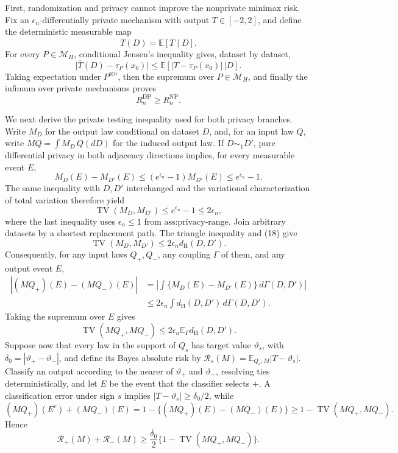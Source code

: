 First, randomization and privacy cannot improve the nonprivate minimax risk.  Fix an \(\epsilon_n\)-differentially private mechanism with output \(T\in[-2,2]\), and define the deterministic measurable map
\[
 \overline T(D)=\mathbb E[T\mid D].
\]
For every \(P\in\mathcal M_H\), conditional Jensen's inequality gives, dataset by dataset,
\[
 \bigl|\overline T(D)-\tau_P(x_0)\bigr|
 \le \mathbb E\!\left[\left.|T-\tau_P(x_0)|\,\right|D\right].                 \tag{16}
\]
Taking expectation under \(P^{\otimes n}\), then the supremum over \(P\in\mathcal M_H\), and finally the infimum over private mechanisms proves
\[
 R_n^{\mathrm{DP}}\ge R_n^{\mathrm{NP}}.                                      \tag{17}
\]

We next derive the private testing inequality used for both privacy branches.  Write \(M_D\) for the output law conditional on dataset \(D\), and, for an input law \(Q\), write \(MQ=\int M_D\,Q(dD)\) for the induced output law.  If \(D\sim_1D'\), pure differential privacy in both adjacency directions implies, for every measurable event \(E\),
\[
 M_D(E)-M_{D'}(E)\le (e^{\epsilon_n}-1)M_{D'}(E)\le e^{\epsilon_n}-1.
\]
The same inequality with \(D,D'\) interchanged and the variational characterization of total variation therefore yield
\[
 \operatorname{TV}(M_D,M_{D'})\le e^{\epsilon_n}-1\le2\epsilon_n,             \tag{18}
\]
where the last inequality uses \(\epsilon_n\le1\) from \(\text{ass:privacy-range}\).  Join arbitrary datasets by a shortest replacement path.  The triangle inequality and (18) give
\[
 \operatorname{TV}(M_D,M_{D'})\le2\epsilon_n d_{\mathrm H}(D,D').
\]
Consequently, for any input laws \(Q_+,Q_-\), any coupling \(\Gamma\) of them, and any output event \(E\),
\[
\begin{aligned}
 \left|(MQ_+)(E)-(MQ_-)(E)\right|
 &=\left|\int\{M_D(E)-M_{D'}(E)\}\,d\Gamma(D,D')\right|\\
 &\le2\epsilon_n\int d_{\mathrm H}(D,D')\,d\Gamma(D,D').
\end{aligned}
\]
Taking the supremum over \(E\) gives
\[
 \operatorname{TV}(MQ_+,MQ_-)
 \le2\epsilon_n\mathbb E_\Gamma d_{\mathrm H}(D,D').                         \tag{19}
\]
Suppose now that every law in the support of \(Q_s\) has target value \(\vartheta_s\), with \(\delta_0=|\vartheta_+-\vartheta_-|\), and define its Bayes absolute risk by \(\mathcal R_s(M)=\mathbb E_{Q_s,M}|T-\vartheta_s|\).  Classify an output according to the nearer of \(\vartheta_+\) and \(\vartheta_-\), resolving ties deterministically, and let \(E\) be the event that the classifier selects \(+\).  A classification error under sign \(s\) implies \(|T-\vartheta_s|\ge\delta_0/2\), while
\[
 (MQ_+)(E^c)+(MQ_-)(E)
 =1-\{(MQ_+)(E)-(MQ_-)(E)\}
 \ge1-\operatorname{TV}(MQ_+,MQ_-).
\]
Hence
\[
 \mathcal R_+(M)+\mathcal R_-(M)
 \ge \frac{\delta_0}{2}
       \{1-\operatorname{TV}(MQ_+,MQ_-)\}.                                  \tag{20}
\]

